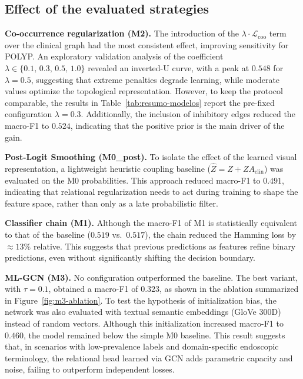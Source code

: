 \documentclass[12pt]{article}
\begin{document}

\subsection{Effect of the evaluated strategies}

\textbf{Co-occurrence regularization (M2).} The introduction of the $\lambda \cdot \mathcal{L}_{\text{coo}}$ term over the clinical graph had the most consistent effect, improving sensitivity for POLYP. An exploratory validation analysis of the coefficient $\lambda \in \{0.1,\,0.3,\,0.5,\,1.0\}$ revealed an inverted-U curve, with a peak at $0.548$ for $\lambda=0.5$, suggesting that extreme penalties degrade learning, while moderate values optimize the topological representation. However, to keep the protocol comparable, the results in Table~\ref{tab:resumo-modelos} report the pre-fixed configuration $\lambda=0.3$. Additionally, the inclusion of inhibitory edges reduced the macro-F1 to $0.524$, indicating that the positive prior is the main driver of the gain.

\textbf{Post-Logit Smoothing (M0\_post).} To isolate the effect of the learned visual representation, a lightweight heuristic coupling baseline ($\hat{Z} = Z + Z A_{\text{clin}}$) was evaluated on the M0 probabilities. This approach reduced macro-F1 to $0.491$, indicating that relational regularization needs to act during training to shape the feature space, rather than only as a late probabilistic filter.

\textbf{Classifier chain (M1).} Although the macro-F1 of M1 is statistically equivalent to that of the baseline ($0.519$ vs.\ $0.517$), the chain reduced the Hamming loss by $\approx 13\%$ relative. This suggests that previous predictions as features refine binary predictions, even without significantly shifting the decision boundary.

\textbf{ML-GCN (M3).} No configuration outperformed the baseline. The best variant, with $\tau=0.1$, obtained a macro-F1 of $0.323$, as shown in the ablation summarized in Figure~\ref{fig:m3-ablation}. To test the hypothesis of initialization bias, the network was also evaluated with textual semantic embeddings (GloVe 300D) instead of random vectors. Although this initialization increased macro-F1 to $0.460$, the model remained below the simple M0 baseline. This result suggests that, in scenarios with low-prevalence labels and domain-specific endoscopic terminology, the relational head learned via GCN adds parametric capacity and noise, failing to outperform independent losses.
\end{document}
